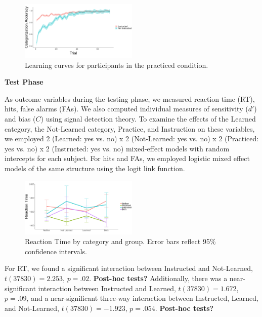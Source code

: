 \documentclass[twocolumn]{svjour3}          %
\begin{document}
\begin{figure}
  \includegraphics[width=0.5\textwidth]{learning.png}
  \caption{Learning curves for participants in the practiced
    condition.}
  \label{fig:learning}
\end{figure}

\noindent\textbf{Test Phase }

As outcome variables during the testing phase, we measured reaction
time (RT), hits, false alarms (FAs). We also computed individual
measures of sensitivity ($d'$) and bias ($C$) using signal detection
theory. To examine the effects of the Learned category, the
Not-Learned category, Practice, and Instruction on these variables, we
employed 2 (Learned: yes vs. no) x 2 (Not-Learned: yes vs. no) x 2
(Practiced: yes vs. no) x 2 (Instructed: yes vs. no) mixed-effect
models with random intercepts for each subject. For hits and FAs, we
employed logistic mixed effect models of the same structure using the
logit link function.

\begin{figure}
  \includegraphics[width=0.5\textwidth]{E6_RT.png}
  \caption{Reaction Time by category and group. Error bars reflect
    95\% confidence intervals.}
  \label{fig:rt}
\end{figure}

For RT, we found a significant interaction between Instructed and
Not-Learned, $t(37830) = 2.253$, $p = .02$. \textbf{Post-hoc tests?}
Additionally, there was a near-significant interaction between
Instructed and Learned, $t(37830) = 1.672$, $p = .09$, and a
near-significant three-way interaction between Instructed, Learned,
and Not-Learned, $t(37830) = -1.923$, $p = .054$. \textbf{Post-hoc
  tests?}
\end{document}
